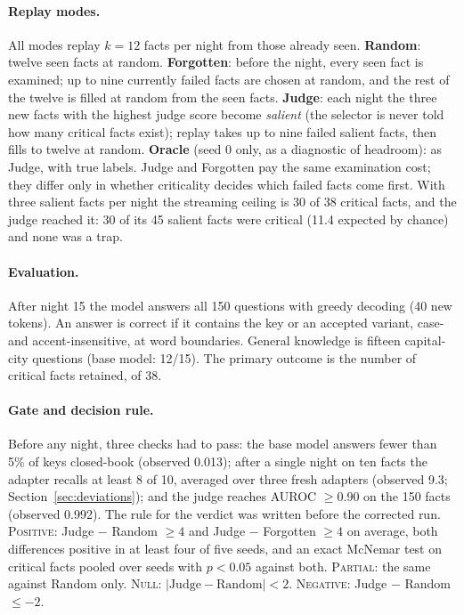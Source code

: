 \documentclass[11pt,a4paper]{article}
\begin{document}
\paragraph{Replay modes.}
All modes replay $k{=}12$ facts per night from those already seen.
\textbf{Random}: twelve seen facts at random.
\textbf{Forgotten}: before the night, every seen fact is examined; up to nine currently failed facts are chosen at random, and the rest of the twelve is filled at random from the seen facts.
\textbf{Judge}: each night the three new facts with the highest judge score become \emph{salient} (the selector is never told how many critical facts exist); replay takes up to nine failed salient facts, then fills to twelve at random.
\textbf{Oracle} (seed 0 only, as a diagnostic of headroom): as Judge, with true labels.
Judge and Forgotten pay the same examination cost; they differ only in whether criticality decides which failed facts come first.
With three salient facts per night the streaming ceiling is 30 of 38 critical facts, and the judge reached it: 30 of its 45 salient facts were critical (11.4 expected by chance) and none was a trap.

\paragraph{Evaluation.}
After night 15 the model answers all 150 questions with greedy decoding (40 new tokens).
An answer is correct if it contains the key or an accepted variant, case- and accent-insensitive, at word boundaries.
General knowledge is fifteen capital-city questions (base model: 12/15).
The primary outcome is the number of critical facts retained, of 38.

\paragraph{Gate and decision rule.}
Before any night, three checks had to pass: the base model answers fewer than 5\% of keys closed-book (observed 0.013); after a single night on ten facts the adapter recalls at least 8 of 10, averaged over three fresh adapters (observed 9.3; Section~\ref{sec:deviations}); and the judge reaches AUROC $\geq 0.90$ on the 150 facts (observed 0.992).
The rule for the verdict was written before the corrected run.
\textsc{Positive}: Judge $-$ Random $\geq 4$ and Judge $-$ Forgotten $\geq 4$ on average, both differences positive in at least four of five seeds, and an exact McNemar test on critical facts pooled over seeds with $p<0.05$ against both.
\textsc{Partial}: the same against Random only.
\textsc{Null}: $|\text{Judge}-\text{Random}|<2$.
\textsc{Negative}: Judge $-$ Random $\leq -2$.
\end{document}
